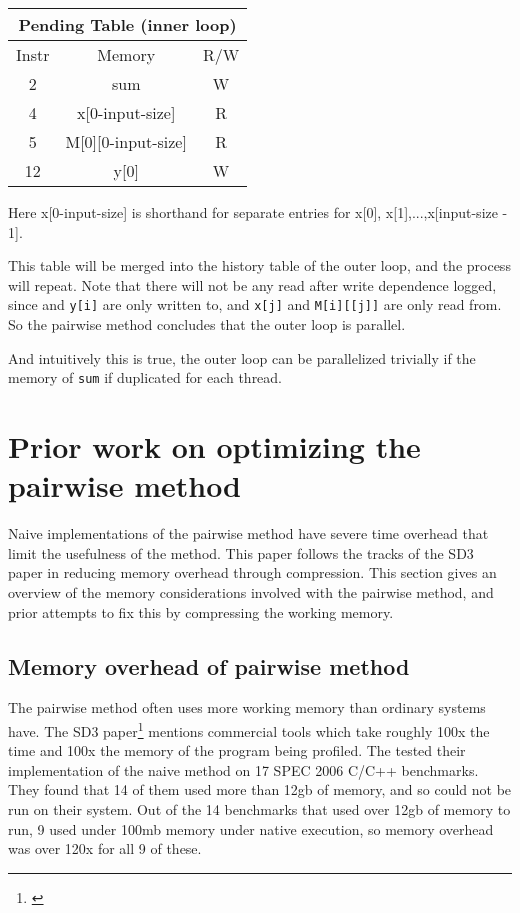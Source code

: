 \documentclass[12pt,twoside]{reedthesis}
\begin{document}
		\begin{tabular}{ |c|c|c| } 
			\hline
			\multicolumn{3}{|c|}{Pending Table (inner loop)} \\
			\hline
			Instr & Memory & R/W \\ 
			\hline
			2 & sum & W \\ 
			4 & x[0-input-size] & R \\ 
			5 & M[0][0-input-size] & R \\ 
			12 & y[0] & W \\
			\hline
		\end{tabular}
	
		Here x[0-input-size] is shorthand for separate entries for x[0], x[1],...,x[input-size - 1].
		
		This table will be merged into the history table of the outer loop, and the process will repeat. Note that there will not be any read after write dependence logged, since  and \texttt{y[i]} are only written to, and \texttt{x[j]} and \texttt{M[i][[j]]} are only read from. So the pairwise method concludes that the outer loop is parallel. 
		
		And intuitively this is true, the outer loop can be parallelized trivially if the memory of \texttt{sum} if duplicated for each thread. 
	
	\section{Prior work on optimizing the pairwise method}
		
		Naive implementations of the pairwise method have severe time overhead that limit the usefulness of the method. This paper follows the tracks of the SD3 paper in reducing memory overhead through compression. This section gives an overview of the memory considerations involved with the pairwise method, and prior attempts to fix this by compressing the working memory. 
		
		\subsection{Memory overhead of pairwise method}
		
		The pairwise method often uses more working memory than ordinary systems have. The SD3 paper\footnote{\cite{text}} mentions commercial tools which take roughly 100x the time and 100x the memory of the program being profiled. The tested their implementation of the naive method on 17 SPEC 2006 C/C++ benchmarks. They found that 14 of them used more than 12gb of memory, and so could not be run on their system. Out of the 14 benchmarks that used over 12gb of memory to run, 9 used under 100mb memory under native execution, so memory overhead was over 120x for all 9 of these. 
		
\end{document}
